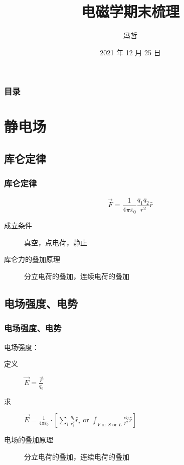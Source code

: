 \documentclass{ctexbeamer}
\title{电磁学期末梳理}
\author{冯哲}
\date{2021 年 12 月 25 日}
\institute{河海大学 理学院}
\begin{document}
\frame{\titlepage}

\begin{frame}
    \frametitle{目录}
    \begin{multicols}{2}
        \tableofcontents
    \end{multicols}
\end{frame}

\section{静电场}

\subsection{库仑定律}

\begin{frame}[c]
    \frametitle{库仑定律}

    $$\vec{F} =\frac{1}{4\pi\varepsilon_0}\frac{q_1q_2}{r^2}\hat{r}$$

    \begin{description}
        \item[成立条件] 真空，点电荷，静止
        \item[库仑力的叠加原理] 分立电荷的叠加，连续电荷的叠加
    \end{description}
\end{frame}

\subsection{电场强度、电势}

\begin{frame}[c]
    \frametitle{电场强度、电势}

    电场强度：
    \begin{description}
        \item[定义] $\vec{E}=\frac{\vec{F}}{q_0}$
        \item[求] $\vec{E}=\frac{1}{4\pi\varepsilon_0}\cdot[\sum_i\frac{q_i}{r_i^2}\hat{r}_i\text{ or }\int_{V\text{ or }S\text{ or }L}\frac{\dd q}{r^2}\hat{r}]$
    \end{description}

    \begin{description}
        \item[电场的叠加原理] 分立电荷的叠加，连续电荷的叠加
    \end{description}
\end{frame}
\end{document}
